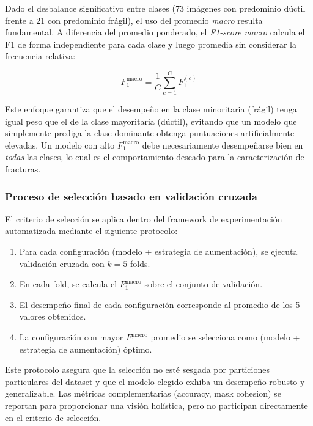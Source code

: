 \documentclass[onecolumn, 12pt , journal]{IEEEtran}
\begin{document}
Dado el desbalance significativo entre clases (73 imágenes con predominio dúctil frente a 21 con predominio frágil), el uso del promedio \emph{macro} resulta fundamental. A diferencia del promedio ponderado, el \emph{F1-score macro} calcula el F1 de forma independiente para cada clase y luego promedia sin considerar la frecuencia relativa:

\begin{equation}
    F_1^{\text{macro}} = \frac{1}{C} \sum_{c=1}^{C} F_1^{(c)}
\end{equation}

Este enfoque garantiza que el desempeño en la clase minoritaria (frágil) tenga igual peso que el de la clase mayoritaria (dúctil), evitando que un modelo que simplemente prediga la clase dominante obtenga puntuaciones artificialmente elevadas. Un modelo con alto $F_1^{\text{macro}}$ debe necesariamente desempeñarse bien en \emph{todas} las clases, lo cual es el comportamiento deseado para la caracterización de fracturas.

\subsubsection{Proceso de selección basado en validación cruzada}

El criterio de selección se aplica dentro del framework de experimentación automatizada mediante el siguiente protocolo:

\begin{enumerate}
    \item Para cada configuración (modelo + estrategia de aumentación), se ejecuta validación cruzada con $k=5$ folds.
    \item En cada fold, se calcula el $F_1^{\text{macro}}$ sobre el conjunto de validación.
    \item El desempeño final de cada configuración corresponde al promedio de los 5 valores obtenidos.
    \item La configuración con mayor $F_1^{\text{macro}}$ promedio se selecciona como (modelo + estrategia de aumentación) óptimo.
\end{enumerate}

Este protocolo asegura que la selección no esté sesgada por particiones particulares del dataset y que el modelo elegido exhiba un desempeño robusto y generalizable. Las métricas complementarias (accuracy, mask cohesion) se reportan para proporcionar una visión holística, pero no participan directamente en el criterio de selección.
\end{document}
